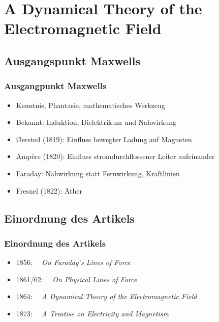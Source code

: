\documentclass[green,10pt]{beamer}
\begin{document}
\section{A Dynamical Theory of the Electromagnetic Field}
  \subsection{Ausgangspunkt Maxwells}
    \begin{frame}
      \frametitle{Ausgangpunkt Maxwells}
        \begin{itemize}[<+->]
          \item Kenntnis, Phantasie, mathematisches Werkzeug
          \item Bekannt: Induktion, Dielektrikum und Nahwirkung
          \item Øersted (1819): Einfluss bewegter Ladung auf Magneten
          \item Ampère (1820): Einfluss stromdurchflossener Leiter aufeinander
          \item Faraday: Nahwirkung statt Fernwirkung, Kraftlinien
          \item Fresnel (1822): Äther
        \end{itemize}

    \end{frame}

  \subsection{Einordnung des Artikels}
    \begin{frame}
      \frametitle{Einordnung des Artikels}
      \begin{itemize}
        \item<1-> 1856: \ \ \textit{On Faraday's Lines of Force}
        \item<2-> 1861/62: \ \ \textit{On Physical Lines of Force}
        \item<3-|alert@5-> 1864: \ \ \textit{A Dynamical Theory of the Electromagnetic Field}
        \item<4-> 1873: \ \ \textit{A Treatise on Electricity and Magnetism}
      \end{itemize}
    \end{frame}
\end{document}
